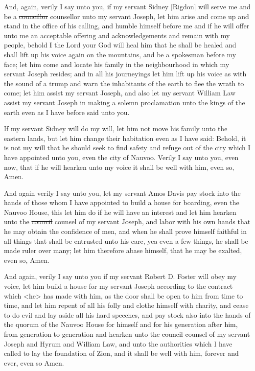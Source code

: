 				And, again, verily I say unto you, if my servant Sidney [Rigdon] will serve me and be a \sout{councillor} counsellor unto my servant Joseph, let him arise and come up and stand in the office of his calling, and humble himself before me and if he will offer unto me an acceptable offering and acknowledgements and remain with my people, behold I the Lord your God will heal him that he shall be healed and shall lift up his voice again on the mountains, and be a spokesman before my face; let him come and locate his family in the neighbourhood in which my servant Joseph resides; and in all his journeyings let him lift up his voice as with the sound of a trump and warn the inhabitants of the earth to flee the wrath to come; let him assist my servant Joseph, and also let my servant William Law assist my servant Joseph in making a solemn proclamation unto the kings of the earth even as I have before said unto you.

				If my servant Sidney will do my will, let him not move his family unto the eastern lands, but let him change their habitation even as I have said: Behold, it is not my will that he should seek to find safety and refuge out of the city which I have appointed unto you, even the city of Nauvoo. Verily I say unto you, even now, that if he will hearken unto my voice it shall be well with him, even so, Amen.

				And again verily I say unto you, let my servant Amos Davis pay stock into the hands of those whom I have appointed to build a house for boarding, even the Nauvoo House, this let him do if he will have an interest and let him hearken unto the \sout{council} counsel of my servant Joseph, and labor with his own hands that he may obtain the confidence of men, and when he shall prove himself faithful in all things that shall be entrusted unto his care, yea even a few things, he shall be made ruler over many; let him therefore abase himself, that he may be exalted, even so, Amen.

				And again, verily I say unto you if my servant Robert D. Foster will obey my voice, let him build a house for my servant Joseph according to the contract which <he> has made with him, as the door shall be open to him from time to time, and let him repent of all his folly and clothe himself with charity, and cease to do evil and lay aside all his hard speeches, and pay stock also into the hands of the quorum of the Nauvoo House for himself and for his generation after him, from generation to generation and hearken unto the \sout{council} counsel of my servant Joseph and Hyrum and William Law, and unto the authorities which I have called to lay the foundation of Zion, and it shall be well with him, forever and ever, even so Amen.

